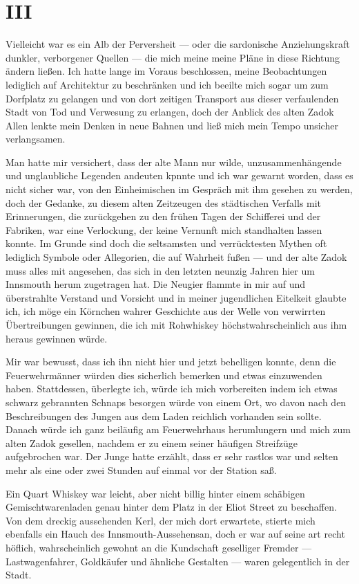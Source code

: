\chapter*{III}

Vielleicht war es ein Alb der Perversheit --- oder die sardonische Anziehungskraft dunkler, verborgener Quellen --- die mich meine meine Pläne in diese Richtung ändern ließen. Ich hatte lange im Voraus beschlossen, meine Beobachtungen lediglich auf Architektur zu beschränken und ich beeilte mich sogar um zum Dorfplatz zu gelangen und von dort zeitigen Transport aus dieser verfaulenden Stadt von Tod und Verwesung zu erlangen, doch der Anblick des alten Zadok Allen lenkte mein Denken in neue Bahnen und ließ mich mein Tempo unsicher verlangsamen.

Man hatte mir versichert, dass der alte Mann nur wilde, unzusammenhängende und unglaubliche Legenden andeuten kpnnte und ich war gewarnt worden, dass es nicht sicher war, von den Einheimischen im Gespräch mit ihm gesehen zu werden, doch der Gedanke, zu diesem alten Zeitzeugen des städtischen Verfalls mit Erinnerungen, die zurückgehen zu den frühen Tagen der Schifferei und der Fabriken, war eine Verlockung, der keine Vernunft mich standhalten lassen konnte. Im Grunde sind doch die seltsamsten und verrücktesten Mythen oft lediglich Symbole oder Allegorien, die auf Wahrheit fußen --- und der alte Zadok muss alles mit angesehen, das sich in den letzten neunzig Jahren hier um Innsmouth herum zugetragen hat. Die Neugier flammte in mir auf und überstrahlte Verstand und Vorsicht und in meiner jugendlichen Eitelkeit glaubte ich, ich möge ein Körnchen wahrer Geschichte aus der Welle von verwirrten Übertreibungen gewinnen, die ich mit Rohwhiskey höchstwahrscheinlich aus ihm heraus gewinnen würde.

Mir war bewusst, dass ich ihn nicht hier und jetzt behelligen konnte, denn die Feuerwehrmänner würden dies sicherlich bemerken und etwas einzuwenden haben. Stattdessen, überlegte ich, würde ich mich vorbereiten indem ich etwas schwarz gebrannten Schnaps besorgen würde von einem Ort, wo davon nach den Beschreibungen des Jungen aus dem Laden reichlich vorhanden sein sollte. Danach würde ich ganz beiläufig am Feuerwehrhaus herumlungern und mich zum alten Zadok gesellen, nachdem er zu einem seiner häufigen Streifzüge aufgebrochen war. Der Junge hatte erzählt, dass er sehr rastlos war und selten mehr als eine oder zwei Stunden auf einmal vor der Station saß.

Ein Quart Whiskey war leicht, aber nicht billig hinter einem schäbigen Gemischtwarenladen genau hinter dem Platz in der Eliot Street zu beschaffen. Von dem dreckig aussehenden Kerl, der mich dort erwartete, stierte mich ebenfalls ein Hauch des \glqq Innsmouth-Aussehens\grqq an, doch er war auf seine art recht höflich, wahrscheinlich gewohnt an die Kundschaft geselliger Fremder --- Lastwagenfahrer, Goldkäufer und ähnliche Gestalten --- waren gelegentlich in der Stadt.

